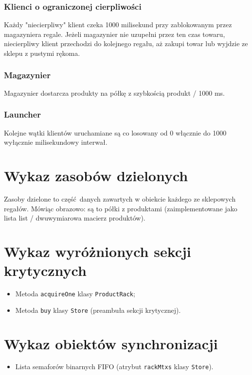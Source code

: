 \documentclass[titlepage]{article}
\begin{document}
\subsubsection{Klienci o ograniczonej cierpliwości}
Każdy "niecierpliwy" klient czeka 1000 milisekund przy zablokowanym przez magazyniera regale.
Jeżeli magazynier nie uzupełni przez ten czas towaru, niecierpliwy klient przechodzi do kolejnego regału, aż zakupi towar lub wyjdzie ze sklepu z pustymi rękoma.

\subsubsection{Magazynier}
Magazynier dostarcza produkty na półkę z szybkością produkt / 1000 ms.

\subsubsection{Launcher}
Kolejne wątki klientów uruchamiane są co losowany od 0 włącznie do 1000 wyłącznie milisekundowy interwał.

\section{Wykaz zasobów dzielonych}
Zasoby dzielone to część danych zawartych w obiekcie każdego ze sklepowych regałów.
Mówiąc obrazowo: są to półki z produktami (zaimplementowane jako lista list / dwuwymiarowa macierz produktów).

\section{Wykaz wyróżnionych sekcji krytycznych}
\begin{itemize}
	\item Metoda \texttt{acquireOne} klasy \texttt{ProductRack};
	\item Metoda \texttt{buy} klasy \texttt{Store} (preambuła sekcji krytycznej).
\end{itemize}

\section{Wykaz obiektów synchronizacji}
\begin{itemize}
	\item Lista semaforów binarnych FIFO (atrybut \texttt{rackMtxs} klasy \texttt{Store}).
\end{itemize}
\end{document}
